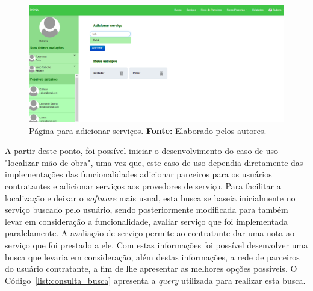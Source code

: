 \begin{figure}[h!]
	\centerline{\includegraphics[scale=0.3]{./imagens/adcionar-servico.png}}
	\caption[Página para adicionar serviços.]
	{Página para adicionar serviços. \textbf{Fonte:} Elaborado pelos autores.}
	\label{fig:adicionar_servicos}
\end{figure}


\par A partir deste ponto, foi possível iniciar o desenvolvimento do caso de uso "localizar mão de obra", uma vez que, este caso de uso dependia diretamente das implementações das funcionalidades adicionar parceiros para os usuários contratantes e adicionar serviços aos provedores de serviço. Para facilitar a localização e deixar o \textit{software} mais usual, esta busca se baseia inicialmente no serviço buscado pelo usuário, sendo posteriormente modificada para também levar em consideração a funcionalidade, avaliar serviço que foi implementada paralelamente. A avaliação de serviço permite ao contratante dar uma nota ao serviço que foi prestado a ele. Com estas informações foi possível desenvolver uma busca que levaria em consideração, além destas informações, a rede de parceiros do usuário contratante, a fim de lhe apresentar as melhores opções possíveis. O Código~\ref{list:consulta_busca} apresenta a \textit{query} utilizada para realizar esta busca.


